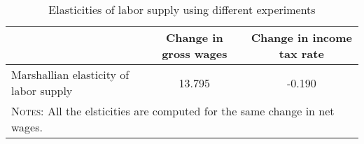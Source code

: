 \begin{table}[htbp]\caption{Elasticities of labor supply using different experiments}\label{table:elasticities}\centering\footnotesize\begin{tabular}{lcc} \toprule & Change in gross wages & Change in income tax rate   \\\midrule    Marshallian elasticity of labor supply &13.795&-0.190\\  \bottomrule\multicolumn{3}{l}{\textsc{Notes:} All the elsticities are computed for the same change in net wages.}\end{tabular}
      \end{table}